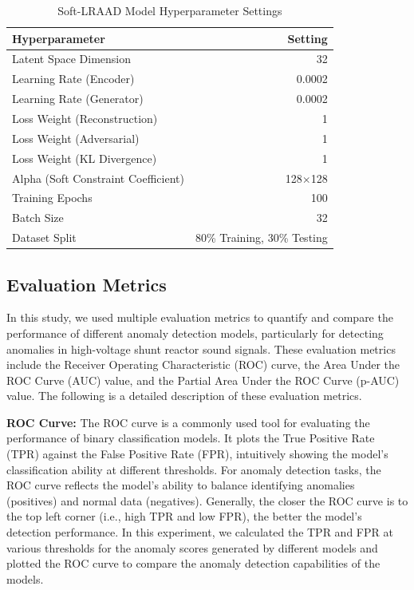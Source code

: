 \documentclass{article}
\begin{document}
\begin{table}
    \centering
    \caption{Soft-LRAAD Model Hyperparameter Settings}
    \label{tab:params}
    \begin{tabular}{lr}
        \toprule
        \textbf{Hyperparameter} & \textbf{Setting} \\
        \midrule
        Latent Space Dimension & 32 \\
        Learning Rate (Encoder) & 0.0002 \\
        Learning Rate (Generator) & 0.0002 \\
        Loss Weight (Reconstruction) & 1 \\
        Loss Weight (Adversarial) & 1 \\
        Loss Weight (KL Divergence) & 1 \\
        Alpha (Soft Constraint Coefficient) & 128$\times $128 \\
        Training Epochs & 100 \\
        Batch Size & 32 \\
        Dataset Split & 80\% Training, 30\% Testing \\
        \bottomrule
    \end{tabular}
\end{table}

\subsection{Evaluation Metrics}

In this study, we used multiple evaluation metrics to quantify and compare the performance of different anomaly detection models, particularly for detecting anomalies in high-voltage shunt reactor sound signals. These evaluation metrics include the Receiver Operating Characteristic (ROC) curve, the Area Under the ROC Curve (AUC) value, and the Partial Area Under the ROC Curve (p-AUC) value. The following is a detailed description of these evaluation metrics.

\textbf{ROC Curve:} The ROC curve is a commonly used tool for evaluating the performance of binary classification models. It plots the True Positive Rate (TPR) against the False Positive Rate (FPR), intuitively showing the model's classification ability at different thresholds. For anomaly detection tasks, the ROC curve reflects the model's ability to balance identifying anomalies (positives) and normal data (negatives). Generally, the closer the ROC curve is to the top left corner (i.e., high TPR and low FPR), the better the model's detection performance. In this experiment, we calculated the TPR and FPR at various thresholds for the anomaly scores generated by different models and plotted the ROC curve to compare the anomaly detection capabilities of the models.
\end{document}
